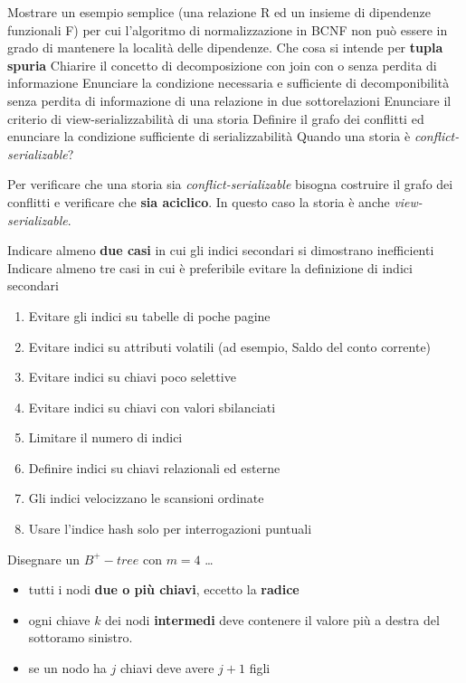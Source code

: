 \documentclass{exam}
\begin{document}
\begin{questions}
\begin{solution}
    \end{solution}
    \question Mostrare un esempio semplice (una relazione R ed un insieme di dipendenze funzionali F) per cui  l’algoritmo di normalizzazione in BCNF non può essere in grado di mantenere la località delle dipendenze. 
    \question Che cosa si intende per \textbf{tupla spuria}
    \question Chiarire il concetto di decomposizione con join con o senza perdita di informazione
    \question Enunciare la condizione necessaria e sufficiente di decomponibilità senza perdita di informazione di una relazione in due sottorelazioni
    \question Enunciare il criterio di view-serializzabilità di una storia
    \question Definire il grafo dei conflitti ed enunciare la condizione sufficiente di serializzabilità
    \question Quando una storia è \textit{conflict-serializable}?
    \begin{solution}
        Per verificare che una storia sia \textit{conflict-serializable} bisogna costruire il grafo dei conflitti e verificare che \textbf{sia aciclico}. In questo caso la storia è anche \textit{view-serializable}.
    \end{solution}
    \question Indicare almeno \textbf{due casi} in cui gli indici secondari si dimostrano inefficienti
    \question Indicare almeno tre casi in cui è preferibile evitare la definizione di indici secondari
    \begin{solution}
        \begin{enumerate}
        \item Evitare gli indici su tabelle di poche pagine  
        \item Evitare indici su attributi volatili (ad esempio, Saldo del conto  corrente)  
        \item Evitare indici su chiavi poco selettive  
        \item Evitare indici su chiavi con valori sbilanciati  
        \item Limitare il numero di indici  
        \item Definire indici su chiavi relazionali ed esterne  
        \item Gli indici velocizzano le scansioni ordinate  
        \item Usare l'indice hash solo per interrogazioni puntuali 
        \end{enumerate}
    \end{solution}
    \question Disegnare un $B^+-tree$ con $m=4$ \dots
    \begin{solution}
        \begin{itemize}
            \item tutti i nodi \textbf{due o più chiavi}, eccetto la \textbf{radice}
            \item ogni chiave $k$ dei nodi \textbf{intermedi} deve contenere il valore più a destra del sottoramo sinistro.
            \item se un nodo ha $j$ chiavi deve avere $j+1$ figli
        \end{itemize}
    \end{solution}
\end{questions}
\end{document}
